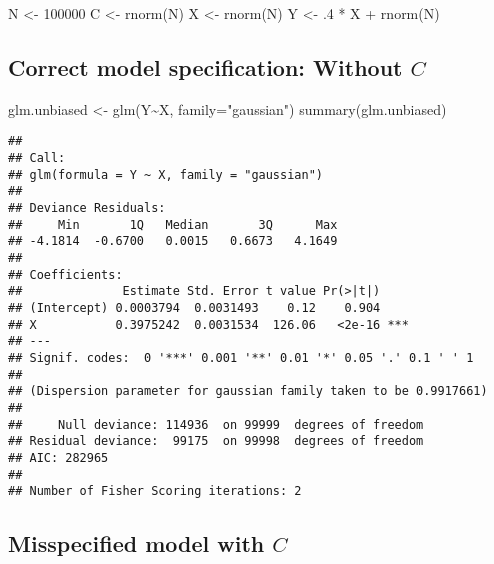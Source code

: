 \documentclass[
]{book}
\newenvironment{Shaded}{\begin{snugshade}}{\end{snugshade}}
\newcommand{\AttributeTok}[1]{\textcolor[rgb]{0.77,0.63,0.00}{#1}}
\newcommand{\DecValTok}[1]{\textcolor[rgb]{0.00,0.00,0.81}{#1}}
\newcommand{\FunctionTok}[1]{\textcolor[rgb]{0.00,0.00,0.00}{#1}}
\newcommand{\NormalTok}[1]{#1}
\newcommand{\OtherTok}[1]{\textcolor[rgb]{0.56,0.35,0.01}{#1}}
\newcommand{\SpecialCharTok}[1]{\textcolor[rgb]{0.00,0.00,0.00}{#1}}
\newcommand{\StringTok}[1]{\textcolor[rgb]{0.31,0.60,0.02}{#1}}
\begin{document}
\begin{Shaded}
\begin{Highlighting}[]
\NormalTok{N }\OtherTok{\textless{}{-}} \DecValTok{100000}
\NormalTok{C }\OtherTok{\textless{}{-}} \FunctionTok{rnorm}\NormalTok{(N)}
\NormalTok{X }\OtherTok{\textless{}{-}} \FunctionTok{rnorm}\NormalTok{(N)}
\NormalTok{Y }\OtherTok{\textless{}{-}}\NormalTok{ .}\DecValTok{4} \SpecialCharTok{*}\NormalTok{ X }\SpecialCharTok{+} \FunctionTok{rnorm}\NormalTok{(N)}
\end{Highlighting}
\end{Shaded}

\hypertarget{correct-model-specification-without-c}{%
\subsection{\texorpdfstring{Correct model specification: Without \(C\)}{Correct model specification: Without C}}\label{correct-model-specification-without-c}}

\begin{Shaded}
\begin{Highlighting}[]
\NormalTok{glm.unbiased }\OtherTok{\textless{}{-}} \FunctionTok{glm}\NormalTok{(Y}\SpecialCharTok{\textasciitilde{}}\NormalTok{X, }\AttributeTok{family=}\StringTok{"gaussian"}\NormalTok{)}
\FunctionTok{summary}\NormalTok{(glm.unbiased)}
\end{Highlighting}
\end{Shaded}

\begin{verbatim}
## 
## Call:
## glm(formula = Y ~ X, family = "gaussian")
## 
## Deviance Residuals: 
##     Min       1Q   Median       3Q      Max  
## -4.1814  -0.6700   0.0015   0.6673   4.1649  
## 
## Coefficients:
##              Estimate Std. Error t value Pr(>|t|)    
## (Intercept) 0.0003794  0.0031493    0.12    0.904    
## X           0.3975242  0.0031534  126.06   <2e-16 ***
## ---
## Signif. codes:  0 '***' 0.001 '**' 0.01 '*' 0.05 '.' 0.1 ' ' 1
## 
## (Dispersion parameter for gaussian family taken to be 0.9917661)
## 
##     Null deviance: 114936  on 99999  degrees of freedom
## Residual deviance:  99175  on 99998  degrees of freedom
## AIC: 282965
## 
## Number of Fisher Scoring iterations: 2
\end{verbatim}

\hypertarget{misspecified-model-with-c}{%
\subsection{\texorpdfstring{Misspecified model with \(C\)}{Misspecified model with C}}\label{misspecified-model-with-c}}
\end{document}
